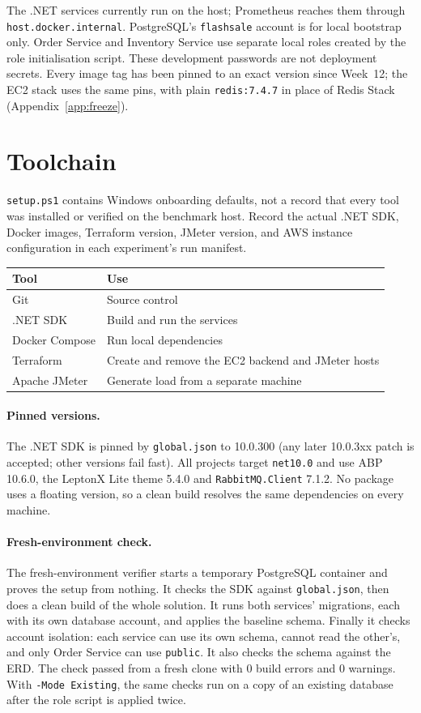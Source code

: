 \documentclass[a4paper]{report}
\begin{document}
The .NET services currently run on the host; Prometheus reaches them through
\texttt{host.docker.internal}. PostgreSQL's \texttt{flashsale} account is for local
bootstrap only. Order Service and Inventory Service use separate local roles
created by the role initialisation script. These development
passwords are not deployment secrets. Every image tag has been pinned to an exact version since Week~12; the EC2 stack uses the same pins, with plain \texttt{redis:7.4.7} in place of Redis Stack (Appendix~\ref{app:freeze}).

\section{Toolchain}

\texttt{setup.ps1} contains Windows onboarding defaults, not a record that every
tool was installed or verified on the benchmark host. Record the actual .NET SDK,
Docker images, Terraform version, JMeter version, and AWS instance configuration
in each experiment's run manifest.

\begin{center}
\begin{tabular}{@{}ll@{}}
\toprule
Tool & Use \\
\midrule
Git & Source control \\
.NET SDK & Build and run the services \\
Docker Compose & Run local dependencies \\
Terraform & Create and remove the EC2 backend and JMeter hosts \\
Apache JMeter & Generate load from a separate machine \\
\bottomrule
\end{tabular}
\end{center}

\paragraph{Pinned versions.} The .NET SDK is pinned by \texttt{global.json} to
10.0.300 (any later 10.0.3xx patch is accepted; other versions fail fast).
All projects target \texttt{net10.0} and use ABP 10.6.0, the LeptonX Lite
theme 5.4.0 and \texttt{RabbitMQ.Client} 7.1.2. No package uses a floating
version, so a clean build resolves the same dependencies on every machine.

\paragraph{Fresh-environment check.} The fresh-environment verifier starts a
temporary PostgreSQL container and proves the setup from nothing.
It checks the SDK against \texttt{global.json}, then does a clean build of the
whole solution. It runs both services' migrations, each with its own database
account, and applies the baseline schema. Finally it checks account isolation:
each service can use its own schema, cannot read the other's, and only Order
Service can use \texttt{public}. It also checks the schema against the ERD.
The check passed from a fresh clone with 0 build errors and 0 warnings.
With \texttt{-Mode Existing}, the same checks run on a copy of an existing
database after the role script is applied twice.
\end{document}
